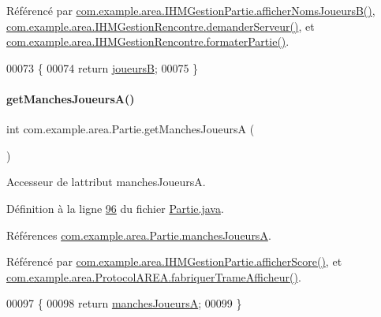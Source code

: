 Référencé par \hyperlink{_i_h_m_gestion_partie_8java_source_l00418}{com.\+example.\+area.\+I\+H\+M\+Gestion\+Partie.\+afficher\+Noms\+Joueurs\+B()}, \hyperlink{_i_h_m_gestion_rencontre_8java_source_l00222}{com.\+example.\+area.\+I\+H\+M\+Gestion\+Rencontre.\+demander\+Serveur()}, et \hyperlink{_i_h_m_gestion_rencontre_8java_source_l00343}{com.\+example.\+area.\+I\+H\+M\+Gestion\+Rencontre.\+formater\+Partie()}.


\begin{DoxyCode}
00073     \{
00074         \textcolor{keywordflow}{return} \hyperlink{classcom_1_1example_1_1area_1_1_partie_a208910b83df461c3a2503f3b28650ce8}{joueursB};
00075     \}
\end{DoxyCode}
\mbox{\label{classcom_1_1example_1_1area_1_1_partie_a7c863edbbdd07ddc7f71616949823201}} 
\paragraph{\texorpdfstring{get\+Manches\+Joueurs\+A()}{getManchesJoueursA()}}
{\footnotesize\ttfamily int com.\+example.\+area.\+Partie.\+get\+Manches\+JoueursA (\begin{DoxyParamCaption}{ }\end{DoxyParamCaption})}



Accesseur de l\textquotesingle{}attribut manches\+JoueursA. 



Définition à la ligne \hyperlink{_partie_8java_source_l00096}{96} du fichier \hyperlink{_partie_8java_source}{Partie.\+java}.



Références \hyperlink{_partie_8java_source_l00041}{com.\+example.\+area.\+Partie.\+manches\+JoueursA}.



Référencé par \hyperlink{_i_h_m_gestion_partie_8java_source_l00435}{com.\+example.\+area.\+I\+H\+M\+Gestion\+Partie.\+afficher\+Score()}, et \hyperlink{_protocol_a_r_e_a_8java_source_l00048}{com.\+example.\+area.\+Protocol\+A\+R\+E\+A.\+fabriquer\+Trame\+Afficheur()}.


\begin{DoxyCode}
00097     \{
00098         \textcolor{keywordflow}{return} \hyperlink{classcom_1_1example_1_1area_1_1_partie_a4563ef3464c670e68405bb7256abb770}{manchesJoueursA};
00099     \}
\end{DoxyCode}
\mbox{\label{classcom_1_1example_1_1area_1_1_partie_a706fa101c4fcad9f2ea6473b5778b55e}} 
